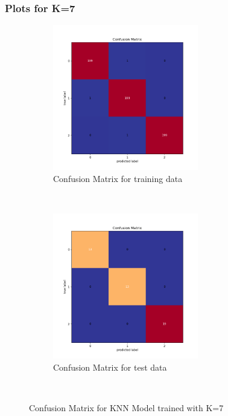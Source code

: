 \newpage
\subsubsection{Plots for K=7}

\begin{figure}[!ht]
    \centering
    \begin{subfigure}[t]{0.5\textwidth}
        \centering
        \includegraphics[height=2.5in]{Dataset_1b/K_7_cmatrix_train_data.png}
        \caption{Confusion Matrix for training data}
    \end{subfigure}%
    ~ 
    \begin{subfigure}[t]{0.5\textwidth}
        \centering
        \includegraphics[height=2.5in]{Dataset_1b/K_7_cmatrix_test_data.png}
        \caption{Confusion Matrix for test data}
    \end{subfigure}%
    ~
    \caption{Confusion Matrix for KNN Model trained with K=7}
    \label{fig:15}
\end{figure}
